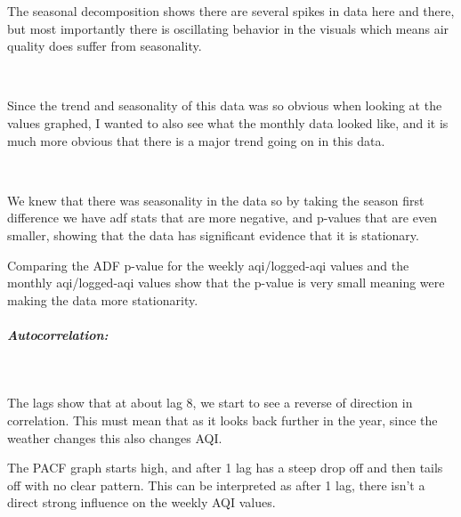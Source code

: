 \documentclass[11pt, twocolumn]{article}
\begin{document}
    The seasonal decomposition shows there are several spikes in data here
and there, but most importantly there is oscillating behavior in the
visuals which means air quality does suffer from seasonality.

    \begin{center}
    \end{center}
    { \hspace*{\fill} \\}
    
    Since the trend and seasonality of this data was so obvious when looking
at the values graphed, I wanted to also see what the monthly data looked
like, and it is much more obvious that there is a major trend going on
in this data.

    \begin{center}
    \end{center}
    { \hspace*{\fill} \\}
    
    We knew that there was seasonality in the data so by taking the season
first difference we have adf stats that are more negative, and p-values
that are even smaller, showing that the data has significant evidence
that it is stationary.

    Comparing the ADF p-value for the weekly aqi/logged-aqi values and the
monthly aqi/logged-aqi values show that the p-value is very small
meaning were making the data more stationarity.

    \subparagraph{Autocorrelation:}\label{autocorrelation}

    \begin{center}
    \end{center}
    { \hspace*{\fill} \\}
    
    The lags show that at about lag 8, we start to see a reverse of
direction in correlation. This must mean that as it looks back further
in the year, since the weather changes this also changes AQI.

The PACF graph starts high, and after 1 lag has a steep drop off and
then tails off with no clear pattern. This can be interpreted as after 1
lag, there isn't a direct strong influence on the weekly AQI values.
\end{document}

